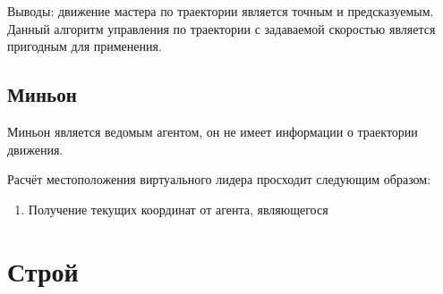 \documentclass[12pt,a4paper]{article}
\begin{document}
Выводы: движение мастера по траектории является точным и предсказуемым. Данный алгоритм управления по траектории с задаваемой скоростью является пригодным для применения.



\subsection{Миньон}
Миньон является ведомым агентом, он не имеет информации о траектории движения. 
\par
Расчёт местоположения виртуального лидера просходит следующим образом:
\begin{enumerate}
	\item Получение текущих координат от агента, являющегося 
\end{enumerate}

\section{Строй}
\end{document}
